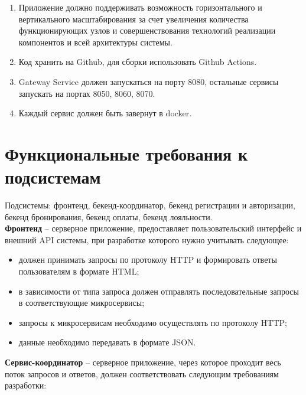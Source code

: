 \begin{enumerate}
	\item Приложение должно поддерживать возможность горизонтального и вертикального масштабирования за счет увеличения количества функционирующих узлов и совершенствования технологий реализации компонентов и всей
	архитектуры системы.
	
	\item Код хранить на Github, для сборки использовать Github Actions.
	
	\item Gateway Service должен запускаться на порту 8080, остальные сервисы запускать на портах 8050, 8060, 8070.
	
	\item Каждый сервис должен быть завернут в docker.
\end{enumerate}

\section*{Функциональные требования к подсистемам}
Подсистемы: фронтенд, бекенд-координатор, бекенд регистрации и авторизации, бекенд бронирования, бекенд оплаты, бекенд лояльности.\\
\textbf{Фронтенд} -- серверное  приложение, предоставляет пользовательский интерфейс и внешний API системы, при  разработке которого нужно учитывать следующее:
\begin{itemize}
	\item должен  принимать  запросы  по  протоколу  HTTP и формировать ответы пользователям в формате HTML;
	
	\item в зависимости от типа запроса должен отправлять последовательные запросы в соответствующие микросервисы;
	
	\item запросы к микросервисам необходимо осуществлять по протоколу HTTP;
	
	\item данные необходимо передавать в формате JSON.
\end{itemize}
\textbf{Сервис-координатор} -- серверное приложение, через которое проходит весь поток запросов и ответов, должен соответствовать следующим требованиям разработки:
